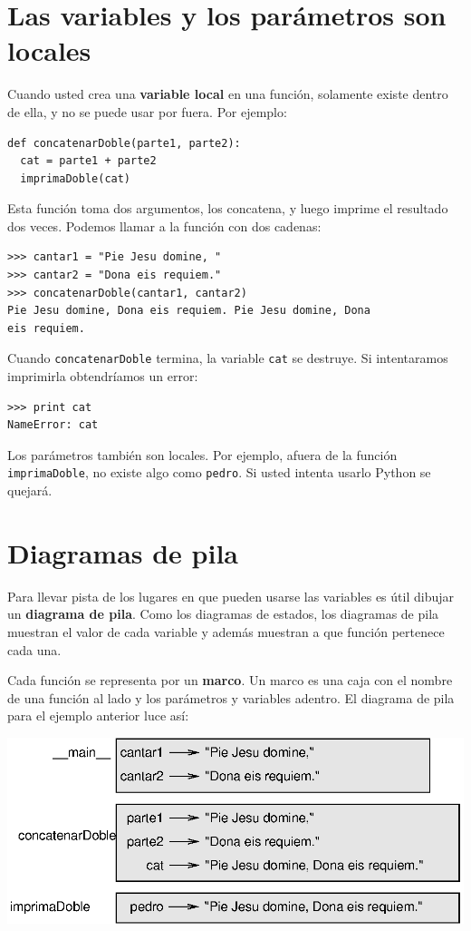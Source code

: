 \section{Las variables y los parámetros son locales}

Cuando usted crea una {\bf variable local} en una función, solamente 
existe dentro de ella, y no se puede usar por fuera. Por ejemplo:

\beforeverb
\begin{verbatim}
def concatenarDoble(parte1, parte2):
  cat = parte1 + parte2
  imprimaDoble(cat)
\end{verbatim}
\afterverb
%
Esta función toma dos argumentos, los concatena, y luego imprime el resultado
dos veces.
Podemos llamar a la función con dos cadenas:

\beforeverb
\begin{verbatim}
>>> cantar1 = "Pie Jesu domine, "
>>> cantar2 = "Dona eis requiem."
>>> concatenarDoble(cantar1, cantar2)
Pie Jesu domine, Dona eis requiem. Pie Jesu domine, Dona 
eis requiem.
\end{verbatim}
\afterverb
%
Cuando \texttt{concatenarDoble} termina, la variable \texttt{cat} se destruye.
Si intentaramos imprimirla obtendríamos un error:

\beforeverb
\begin{verbatim}
>>> print cat
NameError: cat
\end{verbatim}
\afterverb
%
Los parámetros también son locales.
Por ejemplo, afuera de la función \texttt{imprimaDoble}, no existe
algo como \texttt{pedro}. Si usted intenta usarlo Python se quejará.


\section{Diagramas de pila}
\label{stackdiagram}

Para llevar pista de los lugares en que pueden usarse las variables
es útil dibujar un {\bf diagrama de pila}. Como los diagramas de estados,
los diagramas de pila muestran el valor de cada variable y además muestran
a que función pertenece cada una.

Cada función se representa por un {\bf marco}.  Un marco es una caja
con el nombre de una función al lado y los parámetros y variables adentro.
El diagrama de pila para el ejemplo anterior luce así:

\beforefig
\centerline{\includegraphics{illustrations/stack.eps}}
\afterfig

